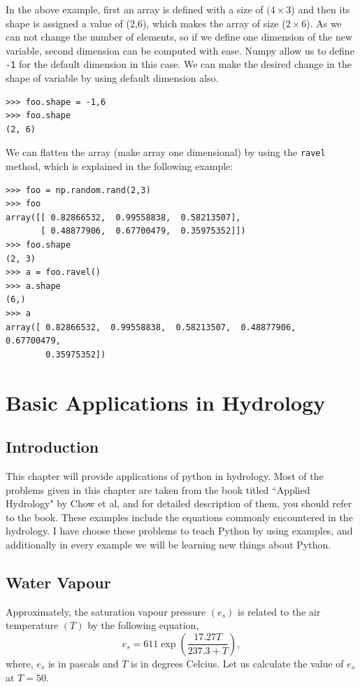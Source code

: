 \documentclass[10pt]{book}
\begin{document}
{In the above example, first an array is defined with a size of ($ 4 \times 3$) and then its shape is assigned a value of (2,6), which makes the array of size ($2 \times 6$). As we can not change the number of elements, so if we define one dimension of the new variable, second dimension can be computed  with ease. Numpy allow us to define \verb"-1" for the default dimension in this case. We can make the desired change in the shape of variable by using default dimension also.
\beforeverb \begin{verbatim}
>>> foo.shape = -1,6
>>> foo.shape
(2, 6)
\end{verbatim} \afterverb
{}

We can flatten the array (make array one dimensional) by using the \verb"ravel" method, which is explained in the following example:
\beforeverb
\begin{verbatim}
>>> foo = np.random.rand(2,3)
>>> foo
array([[ 0.82866532,  0.99558838,  0.58213507],
       [ 0.48877906,  0.67700479,  0.35975352]])
>>> foo.shape
(2, 3)
>>> a = foo.ravel()
>>> a.shape
(6,)
>>> a
array([ 0.82866532,  0.99558838,  0.58213507,  0.48877906,  0.67700479,
        0.35975352])
\end{verbatim}
\afterverb


\chapter{Basic Applications in Hydrology}
\section{Introduction}
This chapter will provide applications of python in hydrology. Most of the problems given in this chapter are taken from the book titled ``Applied Hydrology" by Chow et al, and for detailed description of them, you should refer to the book. These examples include the equations commonly encountered in the hydrology. I have choose these problems to teach Python by using examples, and additionally in every example we will be learning new things about Python. \\

\section{Water Vapour}
Approximately, the saturation vapour pressure $(e_s)$ is related to the air temperature $(T)$ by the following equation,
\begin{equation}
e_s = 611 \exp\left( \frac{17.27T}{237.3+T} \right),
\end{equation}
where, $e_s$ is in pascals and $T$ is in degrees Celcius. Let us calculate the value of $e_s$ at $T=50$.

}
\end{document}
